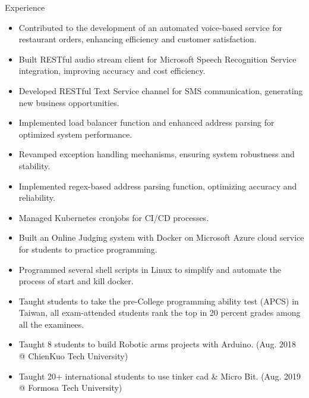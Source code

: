 \documentclass{resume} %
\begin{document}
\begin{workSection}{Experience}
    \experienceItem[
        company=Novo Labs Inc,
        location=Dallas\, TX,
        position=Software Engineer,
        duration=Feb 2021 – Jun 2023
    ]
     \begin{itemize}
        \itemsep -6pt {} 
        \item Contributed to the development of an automated voice-based service for restaurant orders, enhancing efficiency and customer satisfaction.
        \item Built RESTful audio stream client for Microsoft Speech Recognition Service integration, improving accuracy and cost efficiency.
        \item Developed RESTful Text Service channel for SMS communication, generating new business opportunities.
        \item Implemented load balancer function and enhanced address parsing for optimized system performance.
        \item Revamped exception handling mechanisms, ensuring system robustness and stability.
        \item Implemented regex-based address parsing function, optimizing accuracy and reliability.
        \item Managed Kubernetes cronjobs for CI/CD processes.
     \end{itemize}
     
    \experienceItem[
        company=CodePro Education \& Universities,
        location=Taichung\, Taiwan,
        position=Software Engineer \& CS Lecturer,
        duration=Dec 2019 – Dec 2020
    ]
    \begin{itemize}
        \itemsep -6pt {} 
        \item Built an Online Judging system with Docker on Microsoft Azure cloud service for students to practice programming.
        \item Programmed several shell scripts in Linux to simplify and automate the process of start and kill docker.
        \item Taught students to take the pre-College programming ability test (APCS) in Taiwan, all exam-attended students rank the top in 20 percent grades among all the examinees.
        \item Taught 8 students to build Robotic arms projects with Arduino. (Aug. 2018 @ ChienKuo Tech University)
        \item Taught 20+ international students to use tinker cad \& Micro Bit. (Aug. 2019 @ Formosa Tech University)
     \end{itemize}


\end{workSection}
\end{document}
